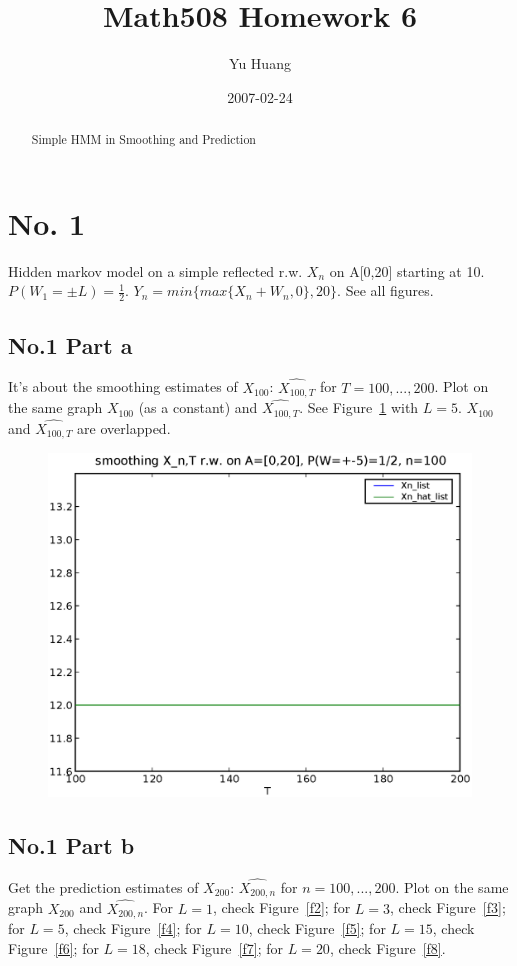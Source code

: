 \documentclass[a4paper,10pt]{article}
\title{Math508 Homework 6}
\author{Yu Huang}
\date{2007-02-24}
\begin{document}
\maketitle

\begin{abstract}
Simple HMM in Smoothing and Prediction
\end{abstract}

\section{No. 1}
Hidden markov model on a simple reflected r.w. $X_n$ on A[0,20] starting at 10. $P(W_1 = \pm L) = \frac{1}{2}$. $Y_n = min\{max\{X_n+W_n, 0\}, 20\}$. See all figures.

\subsection{No.1 Part a}
It's about the smoothing estimates of $X_{100}$: $\hat{X_{100,T}}$ for $T = 100, ..., 200$. Plot on the same graph $X_{100}$ (as a constant) and $\hat{X_{100,T}}$. See Figure~\ref{f1} with $L=5$. $X_100$ and $\hat{X_{100,T}}$ are overlapped.

\begin{figure}[h]
\includegraphics[width=1\textwidth]{hw6_1_a_K_20_L_5_n_100.eps}
\caption{}\label{f1}
\end{figure}

\subsection{No.1 Part b}
Get the prediction estimates of $X_{200}$: $\hat{X_{200,n}}$ for $n=100,...,200$. Plot on the same graph $X_{200}$ and $\hat{X_{200,n}}$. For $L=1$, check Figure~\ref{f2}; for $L=3$, check Figure~\ref{f3}; for $L=5$, check Figure~\ref{f4}; for $L=10$, check Figure~\ref{f5}; for $L=15$, check Figure~\ref{f6}; for $L=18$, check Figure~\ref{f7}; for $L=20$, check Figure~\ref{f8}.
\end{document}
